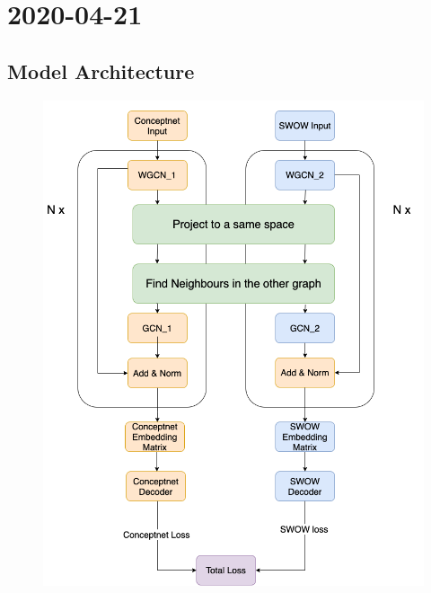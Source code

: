 \chapter{2020-04-21}
%

    
        
    
\section{Model Architecture}
\begin{figure}[!ht]
    \centering
    \includegraphics[scale=0.45]{images/conceptnet-swow.png}
     \label{fig:concept-swow-model-architecture}
\end{figure}

